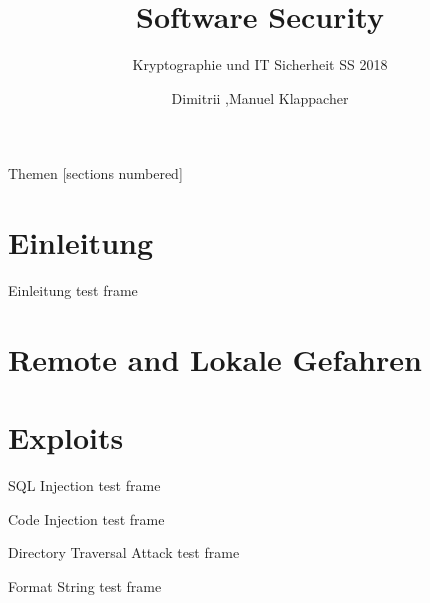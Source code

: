 \documentclass[10pt]{beamer}
\title{Software Security}
\subtitle{Kryptographie und IT Sicherheit SS 2018}
\date{}
\author{Dimitrii ,Manuel Klappacher}
\institute{Universit\"at Salzburg}
\begin{document}
\maketitle

\begin{frame}{Themen}
  [sections numbered]
  \tableofcontents[hideallsubsections]
\end{frame}


\section{Einleitung}

\begin{frame}[fragile]{Einleitung}
  test frame
\end{frame}


\section{Remote and Lokale Gefahren}


\section{Exploits}
\begin{frame}[fragile]{SQL Injection}
  test frame
\end{frame}

\begin{frame}[fragile]{Code Injection}
  test frame
\end{frame}

\begin{frame}[fragile]{Directory Traversal Attack}
  test frame
\end{frame}

\begin{frame}[fragile]{Format String}
  test frame
\end{frame}
\end{document}
